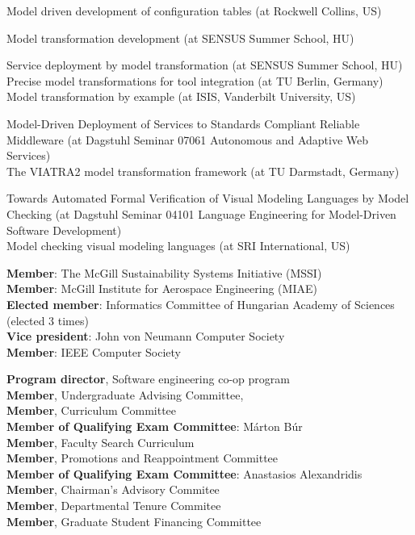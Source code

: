 \documentclass{xetexCV}
\begin{document}
Model driven  development of configuration tables (at Rockwell Collins, US)

Model transformation development (at SENSUS Summer School, HU)

Service deployment by model transformation (at SENSUS Summer School, HU)
\\

Precise model transformations for tool integration (at TU Berlin, Germany)
 \\

Model transformation by example (at ISIS, Vanderbilt University, US)

Model-Driven Deployment of Services to Standards Compliant Reliable
Middleware (at Dagstuhl Seminar 07061 Autonomous and Adaptive Web Services)
\\

The VIATRA2 model transformation framework (at TU Darmstadt, Germany)

Towards Automated Formal Verification of Visual Modeling Languages
by Model Checking (at Dagstuhl Seminar 04101 Language Engineering for Model-Driven
Software Development) \\

Model checking visual modeling languages (at SRI International, US) 

\textbf{Member}:   The McGill Sustainability Systems Initiative (MSSI)\\
\textbf{Member}:   McGill Institute for Aerospace Engineering (MIAE)\\
\textbf{Elected member}:  Informatics Committee of Hungarian Academy of Sciences (elected 3 times)  \\
\textbf{Vice president}:  John von Neumann Computer Society \\
\textbf{Member}: IEEE Computer Society 

\textbf{Program director}, Software engineering co-op program \\
\textbf{Member}, Undergraduate Advising Committee,  \\
\textbf{Member}, Curriculum Committee \\
\textbf{Member of Qualifying Exam Committee}:  M\'arton B\'ur\\
\textbf{Member}, Faculty Search Curriculum \\
\textbf{Member}, Promotions and Reappointment Committee \\
\textbf{Member of Qualifying Exam Committee}:  Anastasios Alexandridis \\
\textbf{Member}, Chairman's Advisory Commitee \\
\textbf{Member}, Departmental Tenure Commitee \\
\textbf{Member}, Graduate Student Financing Committee \\
\end{document}
